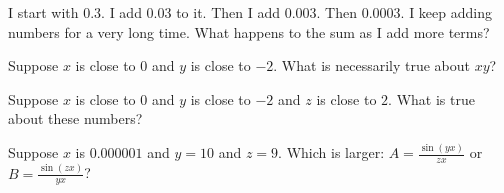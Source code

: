 \documentclass{ximera}
\begin{document}
\begin{shuffle}
\begin{problem}
	I start with $0.3$.  I add $0.03$ to it.  Then I add $0.003$.  Then $0.0003$.  I keep adding numbers for a very long time.  What happens to the sum as I add more terms?
	\begin{multipleChoice}
	\end{multipleChoice}
\end{problem}



\begin{problem}
  Suppose $x$ is close to $0$ and $y$ is close to $-2$.  What is necessarily true about $xy$?
  \begin{multipleChoice}
  \end{multipleChoice}
\end{problem}

\begin{problem}
  Suppose $x$ is close to $0$ and $y$ is close to $-2$ and $z$ is close to $2$.  What is true about these numbers?
  \begin{multipleChoice}
  \end{multipleChoice}
\end{problem}

\begin{problem}
  Suppose $x$ is $0.000001$ and $y = 10$ and $z = 9$.  Which is larger:
  $A = \frac{\sin (yx)}{zx}$ or $B = \frac{\sin (zx)}{yx}$?
  \begin{multipleChoice}
  \end{multipleChoice}
\end{problem}


\end{shuffle}
\end{document}
